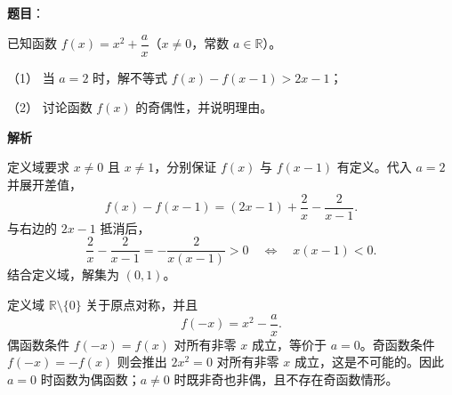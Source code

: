 \begin{answer}

\textbf{题目}：

已知函数 $f(x)=x^2+\dfrac{a}{x}$（$x\ne0$，常数 $a\in\mathbb{R}$）。

（1） 当 $a=2$ 时，解不等式 $f(x)-f(x-1)>2x-1$；

（2） 讨论函数 $f(x)$ 的奇偶性，并说明理由。

\textbf{解析}


定义域要求 $x\ne0$ 且 $x\ne1$，分别保证 $f(x)$ 与 $f(x-1)$ 有定义。代入 $a=2$ 并展开差值，
\nopagebreak[4]
\[
f(x)-f(x-1)=(2x-1)+\frac2x-\frac2{x-1}.
\]
与右边的 $2x-1$ 抵消后，
\nopagebreak[4]
\[
\frac2x-\frac2{x-1}=-\frac{2}{x(x-1)}>0
\quad\Longleftrightarrow\quad x(x-1)<0.
\]
结合定义域，解集为 $(0,1)$。


定义域 $\mathbb R\setminus\{0\}$ 关于原点对称，并且
\nopagebreak[4]
\[
f(-x)=x^2-\frac a x.
\]
偶函数条件 $f(-x)=f(x)$ 对所有非零 $x$ 成立，等价于 $a=0$。奇函数条件 $f(-x)=-f(x)$ 则会推出 $2x^2=0$ 对所有非零 $x$ 成立，这是不可能的。因此 $a=0$ 时函数为偶函数；$a\ne0$ 时既非奇也非偶，且不存在奇函数情形。



\end{answer}
